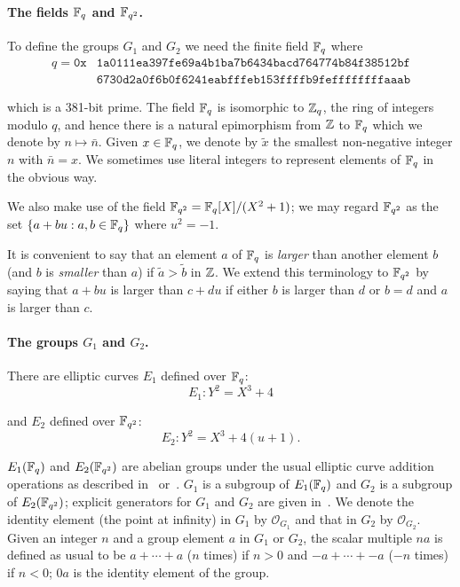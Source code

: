 \paragraph{The fields $\mathbb{F}_q$ and $\mathbb{F}_{q^2}$.}
\noindent To define the groups $G_1$ and $G_2$ we need the finite field $\mathbb{F}_q$ where
\begin{align*}
q = \mathtt{0x}&\mathtt{1a0111ea397fe69a4b1ba7b6434bacd764774b84f38512bf}\\
              &\mathtt{6730d2a0f6b0f6241eabfffeb153ffffb9feffffffffaaab}
\end{align*}

\noindent which is a 381-bit prime. The field $\mathbb{F}_q$ is isomorphic to $\mathbb{Z}_q$,
the ring of integers modulo $q$, and hence there is a natural epimorphism from
$\mathbb{Z}$ to $\mathbb{F}_q$ which we denote by $n \mapsto \bar{n}$.  Given $x \in \mathbb{F}_q$, we
denote by $\tilde{x}$ the smallest non-negative integer $n$ with $\bar{n} = x$.
We sometimes use literal integers to represent elements of $\mathbb{F}_q$ in the obvious
way.

We also make use of the field $\mathbb{F}_{q^2} = \mathbb{F}_q[X]/(X^2+1)$; we may regard $\mathbb{F}_{q^2}$ as
the set $\{a+bu: a,b \in \mathbb{F}_q\}$ where $u^2=-1$.

It is convenient to say that an element $a$ of $\mathbb{F}_q$ is \textit{larger} than
another element $b$ (and $b$ is \textit{smaller} than $a$) if $\tilde{a}
> \tilde{b}$ in $\mathbb{Z}$.  We extend this terminology to $\mathbb{F}_{q^2}$ by saying that
$a+bu$ is larger than $c+du$ if either $b$ is larger than $d$ or $b=d$ and $a$
is larger than $c$.


\paragraph{The groups $G_1$ and $G_2$.}
\noindent There are elliptic curves $E_1$ defined over $\mathbb{F}_q$:
$$
E_1: Y^2 = X^3 + 4
$$

\noindent and $E_2$ defined over $\mathbb{F}_{q^2}$:
$$
E_2: Y^2 = X^3 + 4(u+1).
$$

\noindent $E_1(\mathbb{F}_q)$ and  $E_2(\mathbb{F}_{q^2})$  are abelian groups under the
usual elliptic curve addition operations as described
in~\cite[III.2]{Silverman-Arithmetic-EC} or~\cite[2.1]{Costello-pairings}.
$G_1$ is a subgroup of $E_1(\mathbb{F}_q)$ and $G_2$ is a subgroup of $E_2(\mathbb{F}_{q^2})$;
explicit generators for $G_1$ and $G_2$ are given
in~\cite[4.2.1]{IETF-pairing-friendly-curves}.  We denote the identity element
(the point at infinity) in $G_1$ by $\mathcal{O}_{G_1}$ and that in $G_2$ by
$\mathcal{O}_{G_2}$.  Given an integer $n$ and a group element $a$ in $G_1$ or
$G_2$, the scalar multiple $na$ is defined as usual to be $a + \cdots + a$ ($n$
times) if $n>0$ and $-a + \cdots + -a$ ($-n$ times) if $n<0$; $0a$ is the
identity element of the group.

